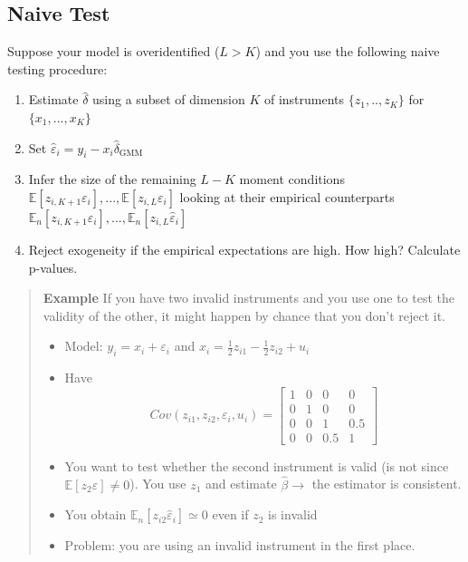 \documentclass[12pt,]{book}
\providecommand{\tightlist}{%
  \setlength{\itemsep}{0pt}\setlength{\parskip}{0pt}}
\begin{document}
\hypertarget{naive-test}{%
\subsection{Naive Test}\label{naive-test}}

Suppose your model is overidentified (\(L > K\)) and you use the following naive testing procedure:

\begin{enumerate}
\def\labelenumi{\arabic{enumi}.}
\tightlist
\item
  Estimate \(\hat{\delta}\) using a subset of dimension \(K\) of instruments \(\{z_1 , .. , z_K\}\) for \(\{x_1 , ... , x_K\}\)
\item
  Set \(\hat{\varepsilon}_i = y_i - x_i \hat{\delta} _ {\text{GMM}}\)
\item
  Infer the size of the remaining \(L-K\) moment conditions \(\mathbb E[z _{i, K+1} \varepsilon_i], ..., \mathbb E[z _{i, L} \varepsilon_i]\) looking at their empirical counterparts \(\mathbb E_n[z _{i, K+1} \hat{\varepsilon}_i], ..., \mathbb E_n[z _{i, L} \hat{\varepsilon}_i]\)
\item
  Reject exogeneity if the empirical expectations are high. How high? Calculate p-values.
\end{enumerate}

\begin{quote}
\textbf{Example}
If you have two invalid instruments and you use one to test the validity of the other, it might happen by chance that you don't reject it.

\begin{itemize}
\tightlist
\item
  Model: \(y_i = x_i + \varepsilon_i\) and \(x_i = \frac{1}{2} z _{i1} - \frac{1}{2} z _{i2} + u_i\)
\item
  Have \[
  Cov (z _{i1}, z _{i2}, \varepsilon_i, u_i) = 
  \begin{bmatrix}
  1 & 0 & 0 & 0 \\ 0 & 1 & 0 & 0 \\ 0 & 0 & 1 & 0.5 \\ 0 & 0 & 0.5 & 1 
  \end{bmatrix}
  \]
\item
  You want to test whether the second instrument is valid (is not since \(\mathbb E[z_2 \varepsilon] \neq 0\)).
  You use \(z_1\) and estimate \(\hat{\beta} \to\) the estimator is consistent.
\item
  You obtain \(\mathbb E_n[z _{i2} \hat{\varepsilon}_i] \simeq 0\) even if \(z_2\) is invalid
\item
  Problem: you are using an invalid instrument in the first place.
\end{itemize}
\end{quote}
\end{document}
